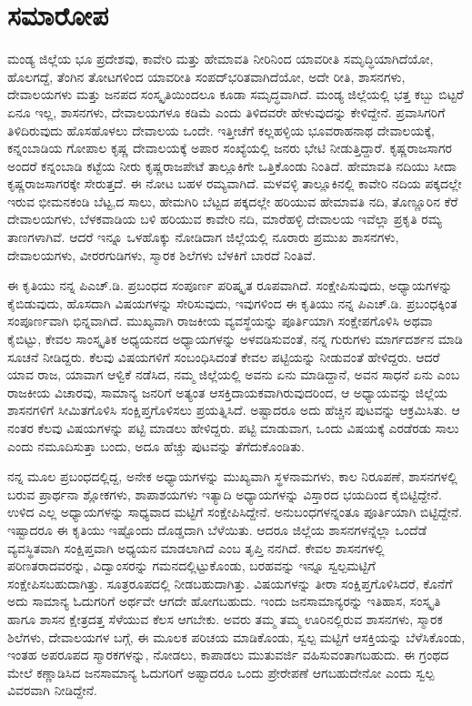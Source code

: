 
\chapter*{ಸಮಾರೋಪ}

ಮಂಡ್ಯ ಜಿಲ್ಲೆಯ ಭೂ ಪ್ರದೇಶವು, ಕಾವೇರಿ ಮತ್ತು ಹೇಮಾವತಿ ನೀರಿನಿಂದ ಯಾವರೀತಿ ಸಮೃದ್ಧಿಯಾಗಿದೆಯೋ, ಹೊಲಗದ್ದೆ, ತೆಂಗಿನ ತೋಟಗಳಿಂದ ಯಾವರೀತಿ ಸಂಪದ್​ಭರಿತವಾಗಿದೆಯೋ, ಅದೇ ರೀತಿ, ಶಾಸನಗಳು, ದೇವಾಲಯಗಳು ಮತ್ತು ಜನಪದ ಸಂಸ್ಕೃತಿಯಿಂದಲೂ ಕೂಡಾ ಸಮೃದ್ಧವಾಗಿದೆ. ಮಂಡ್ಯ ಜಿಲ್ಲೆಯಲ್ಲಿ ಭತ್ತ ಕಬ್ಬು ಬಿಟ್ಟರೆ ಏನೂ ಇಲ್ಲ, ಶಾಸನಗಳು, ದೇವಾಲಯಗಳೂ ಕಡಿಮೆ ಎಂದು ತಿಳಿದವರೇ ಹೇಳುವುದನ್ನು ಕೇಳಿದ್ದೇನೆ. ಪ್ರವಾಸಿಗರಿಗೆ ತಿಳಿದಿರುವುದು ಹೊಸಹೊಳಲು ದೇವಾಲಯ ಒಂದೇ. ಇತ್ತೀಚೆಗೆ ಕಲ್ಲಹಳ್ಳಿಯ ಭೂವರಾಹನಾಥ ದೇವಾಲಯಕ್ಕೆ, ಕನ್ನಂಬಾಡಿಯ ಗೋಪಾಲ ಕೃಷ್ಣ ದೇವಾಲಯಕ್ಕೆ ಅಪಾರ ಸಂಖ್ಯೆಯಲ್ಲಿ ಜನರು ಭೇಟಿ ನೀಡುತ್ತಿದ್ದಾರೆ. ಕೃಷ್ಣರಾಜಸಾಗರ ಅಂದರೆ ಕನ್ನಂಬಾಡಿ ಕಟ್ಟೆಯ ನೀರು ಕೃಷ್ಣರಾಜಪೇಟೆ ತಾಲ್ಲೂಕಿಗೇ ಒತ್ತಿಕೊಂಡು ನಿಂತಿದೆ. ಹೇಮಾವತಿ ನದಿಯು ಸೀದಾ ಕೃಷ್ಣರಾಜಸಾಗರಕ್ಕೇ ಸೇರುತ್ತದೆ. ಈ ನೋಟ ಬಹಳ ರಮ್ಯವಾಗಿದೆ. ಮಳವಳ್ಳಿ ತಾಲ್ಲೂಕಿನಲ್ಲಿ ಕಾವೇರಿ ನದಿಯ ಪಕ್ಕದಲ್ಲೇ ಇರುವ ಭೀಮನಕಂಡಿ ಬೆಟ್ಟ,ದ ಸಾಲು, ಹೇಮಗಿರಿ ಬೆಟ್ಟದ ಪಕ್ಕದಲ್ಲೇ ಹರಿಯುವ ಹೇಮಾವತಿ ನದಿ, ತೊಣ್ಣೂರಿನ ಕೆರೆ ದೇವಾಲಯಗಳು, ಬೆಳಕವಾಡಿಯ ಬಳಿ ಹರಿಯುವ ಕಾವೇರಿ ನದಿ, ಮಾರೆಹಳ್ಳಿ ದೇವಾಲಯ ಇವೆಲ್ಲಾ ಪ್ರಕೃತಿ ರಮ್ಯ ತಾಣಗಳಾಗಿವೆ. ಆದರೆ ಇನ್ನೂ ಒಳಹೊಕ್ಕು ನೋಡಿದಾಗ ಜಿಲ್ಲೆಯಲ್ಲಿ ನೂರಾರು ಪ್ರಮುಖ ಶಾಸನಗಳು, ದೇವಾಲಯಗಳು, ವೀರರಗುಡಿಗಳು, ಸ್ಮಾರಕ ಶಿಲೆಗಳು ಬೆಳಕಿಗೆ ಬಾರದೆ ನಿಂತಿವೆ.

ಈ ಕೃತಿಯು ನನ್ನ ಪಿಎಚ್​.ಡಿ. ಪ್ರಬಂಧದ ಸಂಪೂರ್ಣ ಪರಿಷ್ಕೃತ ರೂಪವಾಗಿದೆ. ಸಂಕ್ಷೇಪಿಸುವುದು, ಅಧ್ಯಾಯಗಳನ್ನು ಕೈಬಿಡುವುದು, ಹೊಸದಾಗಿ ವಿಷಯಗಳನ್ನು ಸೇರಿಸುವುದು, ಇವುಗಳಿಂದ ಈ ಕೃತಿಯು ನನ್ನ ಪಿಎಚ್​.ಡಿ. ಪ್ರಬಂಧಕ್ಕಿಂತ ಸಂಪೂರ್ಣವಾಗಿ ಭಿನ್ನವಾಗಿದೆ. ಮುಖ್ಯವಾಗಿ ರಾಜಕೀಯ ವ್ಯವಸ್ಥೆಯನ್ನು ಪೂರ್ತಿಯಾಗಿ ಸಂಕ್ಷೇಪಗೊಳಿಸಿ ಅಥವಾ ಕೈಬಿಟ್ಟು, ಕೇವಲ ಸಾಂಸ್ಕೃತಿಕ ಅಧ್ಯಯನದ ಅಧ್ಯಾಯಗಳನ್ನು ಅಳವಡಿಸುವಂತೆ, ನನ್ನ ಗುರುಗಳು ಮಾರ್ಗದರ್ಶನ ಮಾಡಿ ಸೂಚನೆ ನೀಡಿದ್ದರು. ಕೆಲವು ವಿಷಯಗಳಿಗೆ ಸಂಬಂಧಿಸಿದಂತೆ ಕೇವಲ ಪಟ್ಟಿಯನ್ನು ನೀಡುವಂತೆ ಹೇಳಿದ್ದರು. ಆದರೆ ಯಾವ ರಾಜ, ಯಾವಾಗ ಆಳ್ವಿಕೆ ನಡೆಸಿದ, ನಮ್ಮ ಜಿಲ್ಲೆಯಲ್ಲಿ ಅವನು ಏನು ಮಾಡಿದ್ದಾನೆ, ಅವನ ಸಾಧನೆ ಏನು ಎಂಬ ರಾಜಕೀಯ ವಿಚಾರವು, ಸಾಮಾನ್ಯ ಜನರಿಗೆ ಅತ್ಯಂತ ಆಸಕ್ತಿದಾಯಕವಾಗಿರುವುದರಿಂದ, ಆ ಅಧ್ಯಾಯವನ್ನು ಜಿಲ್ಲೆಯ ಶಾಸನಗಳಿಗೆ ಸೀಮಿತಗೊಳಿಸಿ ಸಂಕ್ಷಿಪ್ತಗೊಳಿಸಲು ಪ್ರಯತ್ನಿಸಿದೆ. ಅಷ್ಟಾದರೂ ಅದು ಹೆಚ್ಚಿನ ಪುಟವನ್ನು ಆಕ್ರಮಿಸಿತು. ಆ ನಂತರ ಕೆಲವು ವಿಷಯಗಳನ್ನು ಪಟ್ಟಿ ಮಾಡಲು ಹೇಳಿದ್ದರು. ಪಟ್ಟಿ ಮಾಡುವಾಗ, ಒಂದು ವಿಷಯಕ್ಕೆ ಎರಡೆರಡು ಸಾಲು ಎಂದು ನಮೂದಿಸುತ್ತಾ ಬಂದು, ಅದೂ ಹೆಚ್ಚು ಪುಟವನ್ನು ತೆಗೆದುಕೊಂಡಿತು.

ನನ್ನ ಮೂಲ ಪ್ರಬಂಧದಲ್ಲಿದ್ದ, ಅನೇಕ ಅಧ್ಯಾಯಗಳನ್ನು ಮುಖ್ಯವಾಗಿ ಸ್ಥಳನಾಮಗಳು, ಕಾಲ ನಿರೂಪಣೆ, ಶಾಸನಗಳಲ್ಲಿ ಬರುವ ಪ್ರಾರ್ಥನಾ ಶ್ಲೋಕಗಳು, ಶಾಪಾಶಯಗಳು ಇತ್ಯಾದಿ ಅಧ್ಯಾಯಗಳನ್ನು ವಿಸ್ತಾರದ ಭಯದಿಂದ ಕೈಬಿಟ್ಟಿದ್ದೇನೆ. ಉಳಿದ ಎಲ್ಲ ಅಧ್ಯಾಯಗಳನ್ನು ಸಾಧ್ಯವಾದ ಮಟ್ಟಿಗೆ ಸಂಕ್ಷೇಪಿಸಿದ್ದೇನೆ. ಅನುಬಂಧಗಳನ್ನಂತೂ ಪೂರ್ತಿಯಾಗಿ ಬಿಟ್ಟಿದ್ದೇನೆ. ಇಷ್ಟಾದರೂ ಈ ಕೃತಿಯು ಇಷ್ಟೊಂದು ದೊಡ್ಡದಾಗಿ ಬೆಳೆಯಿತು. ಆದರೂ ಜಿಲ್ಲೆಯ ಶಾಸನಗಳನ್ನೆಲ್ಲಾ ಒಂದೆಡೆ ವ್ಯವಸ್ಥಿತವಾಗಿ ಸಂಕ್ಷಿಪ್ತವಾಗಿ ಅಧ್ಯಯನ ಮಾಡಲಾಗಿದೆ ಎಂಬ ತೃಪ್ತಿ ನನಗಿದೆ. ಕೇವಲ ಶಾಸನಗಳಲ್ಲಿ ಪರಿಣತರಾದವರನ್ನು, ವಿದ್ವಾಂಸರನ್ನು ಗಮನದಲ್ಲಿಟ್ಟುಕೊಂಡು, ಬರಹವನ್ನು ಇನ್ನೂ ಸ್ವಲ್ಪಮಟ್ಟಿಗೆ ಸಂಕ್ಷೇಪಿಸಬಹುದಾಗಿತ್ತು. ಸೂತ್ರರೂಪದಲ್ಲಿ ನೀಡಬಹುದಾಗಿತ್ತು. ವಿಷಯಗಳನ್ನು ತೀರಾ ಸಂಕ್ಷಿಪ್ತಗೊಳಿಸಿದರೆ, ಕೊನೆಗೆ ಅದು ಸಾಮಾನ್ಯ ಓದುಗರಿಗೆ ಅರ್ಥವೇ ಆಗದೇ ಹೋಗಬಹುದು. ಇಂದು ಜನಸಾಮಾನ್ಯರನ್ನು ಇತಿಹಾಸ, ಸಂಸ್ಕೃತಿ ಹಾಗೂ ಶಾಸನ ಕ್ಷೇತ್ರದತ್ತ ಸೆಳೆಯುವ ಕೆಲಸ ಆಗಬೇಕು. ಅವರು ತಮ್ಮ ತಮ್ಮ ಊರಿನಲ್ಲಿರುವ ಶಾಸನಗಳು, ಸ್ಮಾರಕ ಶಿಲೆಗಳು, ದೇವಾಲಯಗಳ ಬಗ್ಗೆ, ಈ ಮೂಲಕ ಪರಿಚಯ ಮಾಡಿಕೊಂಡು, ಸ್ವಲ್ಪ ಮಟ್ಟಿಗೆ ಆಸಕ್ತಿಯನ್ನು ಬೆಳೆಸಿಕೊಂಡು, ಇಂತಹ ಅಪರೂಪದ ಸ್ಮಾರಕಗಳನ್ನು, ನೋಡಲು, ಕಾಪಾಡಲು ಮುತುವರ್ಜಿ ವಹಿಸುವಂತಾಗಬಹುದು. ಈ ಗ್ರಂಥದ ಮೇಲೆ ಕಣ್ಣಾಡಿಸಿದ ಜನಸಾಮಾನ್ಯ ಓದುಗರಿಗೆ ಅಷ್ಟಾದರೂ ಒಂದು ಪ್ರೇರೇಪಣೆ ಆಗಬಹುದೇನೋ ಎಂದು ಸ್ವಲ್ಪ ವಿವರವಾಗಿ ನೀಡಿದ್ದೇನೆ.

